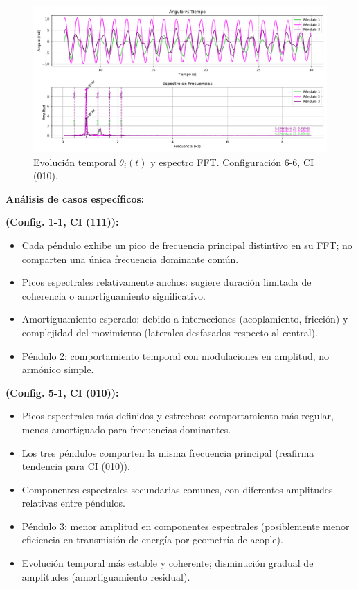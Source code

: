 \begin{figure}[htbp!]
    \centering
    \includegraphics[width=0.8\linewidth]{./Figures/010_66_filtrado.pdf}
    \caption{Evoluci\'on temporal $\theta_i(t)$ y espectro FFT.
        Configuraci\'on 6-6, CI (010).}
    \label{fig:010-66}
\end{figure}

\textbf{An\'alisis de casos espec\'ificos:}

\textbf{ (Config. 1-1, CI (111)):}
\begin{itemize}
  \item Cada p\'endulo exhibe un pico de frecuencia principal distintivo en su
    FFT; no comparten una \'unica frecuencia dominante com\'un.
  \item Picos espectrales relativamente anchos: sugiere duraci\'on limitada
    de coherencia o amortiguamiento significativo.
  \item Amortiguamiento esperado: debido a interacciones (acoplamiento,
    fricci\'on) y complejidad del movimiento (laterales desfasados
    respecto al central).
  \item P\'endulo 2: comportamiento temporal con modulaciones en amplitud,
    no arm\'onico simple.
\end{itemize}

\textbf{ (Config. 5-1, CI (010)):}
\begin{itemize}
  \item Picos espectrales m\'as definidos y estrechos: comportamiento m\'as
    regular, menos amortiguado para frecuencias dominantes.
  \item Los tres p\'endulos comparten la misma frecuencia principal (reafirma
    tendencia para CI (010)).
  \item Componentes espectrales secundarias comunes, con diferentes
    amplitudes relativas entre p\'endulos.
  \item P\'endulo 3: menor amplitud en componentes espectrales (posiblemente
    menor eficiencia en transmisi\'on de energ\'ia por geometr\'ia de
    acople).
  \item Evoluci\'on temporal m\'as estable y coherente; disminuci\'on gradual
    de amplitudes (amortiguamiento residual).
\end{itemize}

